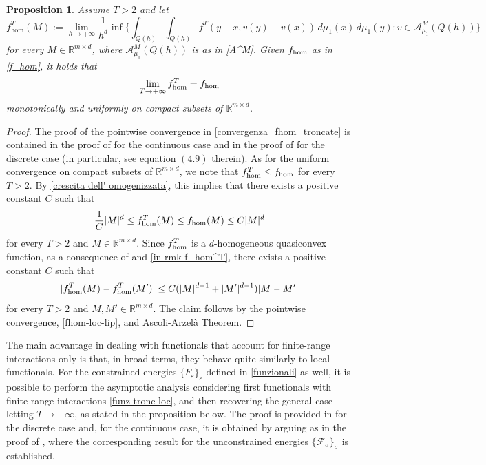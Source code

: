 \documentclass{article}
\theoremstyle{plain}
\newtheorem{proposition}[theorem]{Proposition}
\theoremstyle{definition}
\def\e{\varepsilon}
\def\rr{{\mathbb R}}
\newcommand{\s}{\sigma}
\newcommand{\F}{\mathcal{F}}
\numberwithin{equation}{section}
\begin{document}
\begin{proposition}
\label{prop_conv_fhom_uniforme}
     Assume $T>2$ and let
  \begin{equation}
       f^T_{\hom}(M):=\lim_{h \rightarrow +\infty}\frac{1}{h^{d}}\inf\Big\{\int_{Q(h)}\int_{Q(h)}f^T(y-x,v(y)-v(x))\, d\mu_1(x)\, d\mu_1(y) : v\in \mathcal{A}^M_{\mu_1}(Q(h))\Big\}
        \label{f^T_hom}
    \end{equation}
for every $M\in \rr^{m \times d}$, where $\mathcal{A}^M_{\mu_1}(Q(h))$ is as in \eqref{A^M}. Given $f_{\rm hom}$ as in \eqref{f_hom}, it holds that
\begin{equation}
\label{convergenza_fhom_troncate}
   \lim_{T\to+\infty}f^T_{\rm hom}=f_{\rm hom}
\end{equation}
monotonically and uniformly on compact subsets of $\mathbb{R}^{m\times d}$. 
\end{proposition}

\begin{proof}
    The proof of the pointwise convergence in \eqref{convergenza_fhom_troncate} is contained in the proof of \cite[Theorem 6.1]{AABPT} for the continuous case and in the proof of \cite[Proposition 4.2]{AliCic} for the discrete case (in particular, see equation $(4.9)$ therein). As for the uniform convergence on compact subsets of $\mathbb{R}^{m\times d}$, we note that $f_{\rm hom}^T\leq f_{\rm hom}$ for every $T>2$. By \eqref{crescita dell' omogenizzata}, this implies that there exists a positive constant $C$ such that
\begin{equation}\label{in rmk f_hom^T}
    \frac{1}{C}|M|^d\leq f_{\rm hom}^T(M)\leq f_{\rm hom}(M)\leq C|M|^d
\end{equation}
for every $T>2$ and $M\in \rr^{m\times d}$. Since $f_{\rm hom}^T$ is a $d$-homogeneous quasiconvex function, as a consequence of \cite[Remark 4.13]{BDF} and \eqref{in rmk f_hom^T}, there exists a positive constant $C$ such that
\begin{equation}\label{fhom-loc-lip}
    |f_{\rm hom}^T(M)-f_{\rm hom}^T(M')|\leq C(|M|^{d-1}+|M'|^{d-1})|M-M'|
\end{equation}
for every $T>2$ and $M,M'\in \rr^{m\times d}$.
The claim follows by the pointwise convergence, \eqref{fhom-loc-lip}, and Ascoli-Arzelà Theorem. 
\end{proof}

The main advantage in dealing with functionals that account for finite-range interactions only is that, in broad terms, they behave quite similarly to local functionals. For the constrained energies $\{F_\e\}_\e$ defined in \eqref{funzionali} as well, it is possible to perform the asymptotic analysis considering first functionals with finite-range interactions \eqref{funz tronc loc}, and then recovering the general case letting $T\to+\infty$, as stated in the proposition below. The proof is provided in \cite[Section 5, Step 1]{Fus} for the discrete case and, for the continuous case, it is obtained by arguing as in the proof of \cite[Lemma 5.1]{AABPT}, where the corresponding result for the unconstrained energies $\{\F_\s\}_\s$ is established. 
\end{document}
